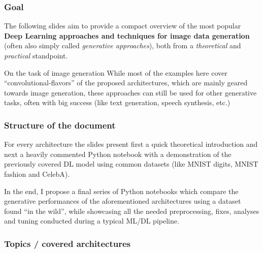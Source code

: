 \begin{frame}
    \frametitle{Goal}
    The following slides aim to provide a compact overview of the most popular \textbf{Deep Learning approaches and techniques for image data generation} (often also simply called \emph{generative approaches}), both from a \emph{theoretical} and \emph{practical} standpoint.

    \begin{block}{On the task of image generation}
        While most of the examples here cover ``convolutional-flavors'' of the proposed architectures, which are mainly geared towards image generation, these approaches can still be used for other generative tasks, often with big success (like text generation, speech synthesis, etc.)
    \end{block}

\end{frame}

\begin{frame}
    \frametitle{Structure of the document}
    For every architecture the slides present first a quick theoretical introduction and next a heavily commented Python notebook with a demonstration of the previously covered DL model using common datasets (like MNIST digits, MNIST fashion and CelebA).

    In the end, I propose a final series of Python notebooks which compare the generative performances of the aforementioned architectures using a dataset found ``in the wild'', while showcasing all the needed preprocessing, fixes, analyses and tuning conducted during a typical ML/DL pipeline.
\end{frame}

\begin{frame}
    \frametitle{Topics / covered architectures}
    \tableofcontents
\end{frame}